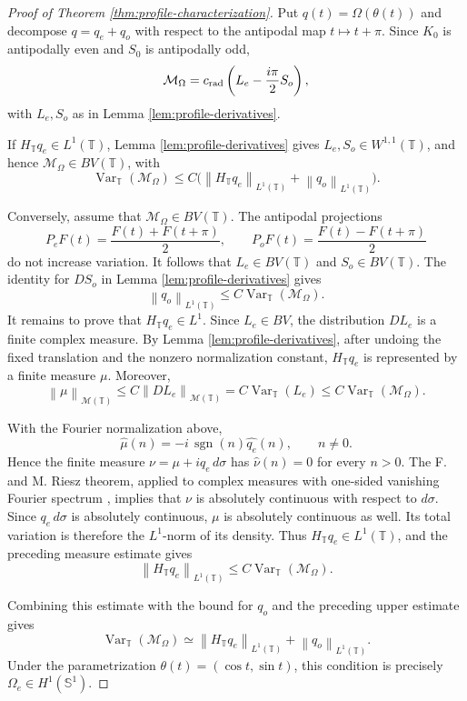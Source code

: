 \documentclass[11pt]{amsart}
\theoremstyle{remark}
\numberwithin{equation}{section}
\newcommand{\T}{\mathbb T}
\newcommand{\Sph}{\mathbb S^1}
\newcommand{\cM}{\mathcal M}
\newcommand{\norm}[1]{\left\lVert #1\right\rVert}
\newcommand{\sgn}{\operatorname{sgn}}
\newcommand{\Var}{\operatorname{Var}}
\begin{document}
	\begin{proof}[Proof of Theorem \ref{thm:profile-characterization}]
		Put \(q(t)=\Omega(\theta(t))\) and decompose
		\(q=q_e+q_o\) with respect to the antipodal map \(t\mapsto t+\pi\).  Since
		\(K_0\) is
		antipodally even and \(S_0\) is antipodally odd,
		\[
		\cM_\Omega
		=
		c_{\rm rad}
		\left(
		L_e-\frac{i\pi}{2}S_o
		\right),
		\]
		with \(L_e,S_o\) as in Lemma \ref{lem:profile-derivatives}.
		
		If \(H_\T q_e\in L^1(\T)\), Lemma \ref{lem:profile-derivatives} gives
		\(L_e,S_o\in W^{1,1}(\T)\), and hence \(\cM_\Omega\in BV(\T)\), with
		\[
		\Var_\T(\cM_\Omega)
		\le
		C
		\bigl(
		\norm{H_\T q_e}_{L^1(\T)}
		+
		\norm{q_o}_{L^1(\T)}
		\bigr).
		\]
		
		Conversely, assume that \(\cM_\Omega\in BV(\T)\).  The antipodal
		projections
		\[
		P_eF(t)=\frac{F(t)+F(t+\pi)}2,
		\qquad
		P_oF(t)=\frac{F(t)-F(t+\pi)}2
		\]
		do not increase variation.  It follows that \(L_e\in BV(\T)\) and
		\(S_o\in BV(\T)\).  The identity for \(DS_o\) in Lemma
		\ref{lem:profile-derivatives} gives
		\[
		\norm{q_o}_{L^1(\T)}\le C\Var_\T(\cM_\Omega).
		\]
		It remains to prove that \(H_\T q_e\in L^1\).  Since \(L_e\in BV\), the
		distribution \(DL_e\) is a finite complex measure.  By Lemma
		\ref{lem:profile-derivatives}, after undoing the fixed translation and the
		nonzero normalization constant, \(H_\T q_e\) is represented by a finite
		measure \(\mu\).  Moreover,
		\[
		\norm{\mu}_{\mathcal M(\T)}
		\le C\norm{DL_e}_{\mathcal M(\T)}
		= C\Var_\T(L_e)
		\le C\Var_\T(\cM_\Omega).
		\]
		
		With the Fourier normalization above,
		\[
		\widehat\mu(n)=-i\,\sgn(n)\widehat{q_e}(n),
		\qquad n\ne0.
		\]
		Hence the finite measure \(\nu=\mu+i q_e\,d\sigma\) has
		\(\widehat\nu(n)=0\) for every \(n>0\).  The F. and M. Riesz theorem,
		applied to complex measures with one-sided vanishing Fourier spectrum
		\cite[Chapter VII]{Zygmund1959}, implies that \(\nu\) is absolutely
		continuous with respect to \(d\sigma\).  Since \(q_e\,d\sigma\) is
		absolutely continuous, \(\mu\) is absolutely continuous as well.  Its total
		variation is therefore the \(L^1\)-norm of its density.  Thus
		\(H_\T q_e\in L^1(\T)\), and the preceding measure estimate gives
		\[
		\norm{H_\T q_e}_{L^1(\T)}
		\le
		C\Var_\T(\cM_\Omega).
		\]
		
		Combining this estimate with the bound for \(q_o\) and the preceding upper
		estimate gives
		\[
		\Var_\T(\cM_\Omega)
		\simeq
		\norm{H_\T q_e}_{L^1(\T)}
		+
		\norm{q_o}_{L^1(\T)}.
		\]
		Under the parametrization \(\theta(t)=(\cos t,\sin t)\), this condition is
		precisely \(\Omega_e\in H^1(\Sph)\).
	\end{proof}
	
\end{document}
